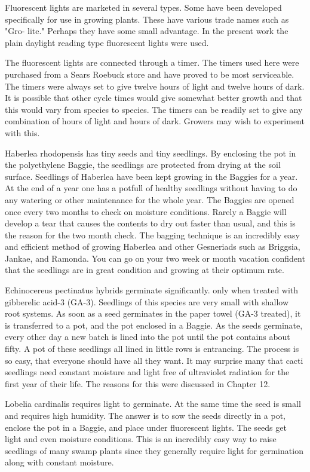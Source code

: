 Fluorescent lights are marketed in several types. Some have been developed
specifically for use in growing plants. These have various trade names such as "Gro-
lite." Perhaps they have some small advantage. In the present work the plain daylight
reading type fluorescent lights were used.

The fluorescent lights are connected through a timer. The timers used here
were purchased from a Sears Roebuck store and have proved to be most serviceable.
The timers were always set to give twelve hours of light and twelve hours of dark. It is
possible that other cycle times would give somewhat better growth and that this would
vary from species to species. The timers can be readily set to give any combination of
hours of light and hours of dark. Growers may wish to experiment with this.

Haberlea rhodopensis has tiny seeds and tiny seedlings. By enclosing the pot
in the polyethylene Baggie, the seedlings are protected from drying at the soil surface.
Seedlings of Haberlea have been kept growing in the Baggies for a year. At the end
of a year one has a potfull of healthy seedlings without having to do any watering or
other maintenance for the whole year. The Baggies are opened once every two
months to check on moisture conditions. Rarely a Baggie will develop a tear that
causes the contents to dry out faster than usual, and this is the reason for the two
month check. The bagging technique is an incredibly easy and efficient method of
growing Haberlea and other Gesneriads such as Briggsia, Jankae, and Ramonda.
You can go on your two week or month vacation confident that the seedlings are in
great condition and growing at their optimum rate.

Echinocereus pectinatus hybrids germinate significantly. only when treated with
gibberelic acid-3 (GA-3). Seedlings of this species are very small with shallow root
systems. As soon as a seed germinates in the paper towel (GA-3 treated), it is
transferred to a pot, and the pot enclosed in a Baggie. As the seeds germinate, every
other day a new batch is lined into the pot until the pot contains about fifty. A pot of
these seedlings all lined in little rows is entrancing. The process is so easy, that
everyone should have all they want. It may surprise many that cacti seedlings need
constant moisture and light free of ultraviolet radiation for the first year of their life. The
reasons for this were discussed in Chapter 12.

Lobelia cardinalis requires light to germinate. At the same time the seed is
small and requires high humidity. The answer is to sow the seeds directly in a pot,
enclose the pot in a Baggie, and place under fluorescent lights. The seeds get light
and even moisture conditions. This is an incredibly easy way to raise seedlings of
many swamp plants since they generally require light for germination along with
constant moisture.

